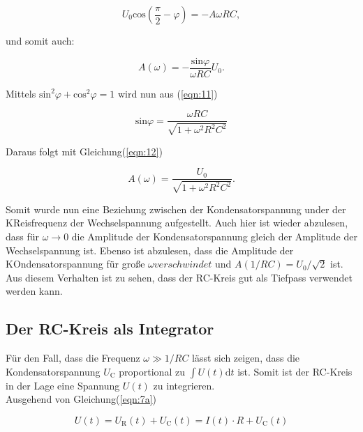         \begin{equation*}
            U_0 \text{cos}(\frac{\pi}{2} - \varphi) = -A \omega R C ,
        \end{equation*}

        \noindent und somit auch:

        \begin{equation}
            A(\omega) = - \frac{\text{sin} \varphi}{\omega R C} U_0 .
            \label{eqn:12}
        \end{equation}

        \noindent Mittels $\text{sin}^2 \varphi + \text{cos}^2 \varphi = 1$ wird nun aus (\ref{eqn:11}) 

        \begin{equation*}
            \text{sin} \varphi = \frac{\omega R C}{ \sqrt{1 + \omega^2 R^2 C^2} }
        \end{equation*}

        \noindent Daraus folgt mit Gleichung(\ref{eqn:12})

        \begin{equation*}
            A(\omega) = \frac{U_0}{\sqrt{1 + \omega^2 R^2 C^2}} .
        \end{equation*}

        \noindent Somit wurde nun eine Beziehung zwischen der Kondensatorspannung under der KReisfrequenz der Wechselspannung aufgestellt. Auch 
        hier ist wieder abzulesen, dass für $\omega \rightarrow 0$ die Amplitude der Kondensatorspannung gleich der Amplitude der Wechselspannung ist.
        Ebenso ist abzulesen, dass die Amplitude der KOndensatorspannung für große $\omega verschwindet$ und $A(1/RC) = U_0 / \sqrt{2}$ ist. 
        Aus diesem Verhalten ist zu sehen, dass der RC-Kreis gut als Tiefpass verwendet werden kann.

    \subsection{Der RC-Kreis als Integrator}

        \noindent Für den Fall, dass die Frequenz $\omega \gg 1/RC$ lässt sich zeigen, dass die Kondensatorspannung $U_{\text{C}}$ proportional 
        zu $\int U(t) \text{d}t$ ist. Somit ist der RC-Kreis in der Lage eine Spannung $U(t)$ zu integrieren.\\
        Ausgehend von Gleichung(\ref{eqn:7a})

        \begin{equation*}
            U(t) = U_{\text{R}}(t) + U_{\text{C}}(t) = I(t) \cdot R + U_{\text{C}}(t)
        \end{equation*}

